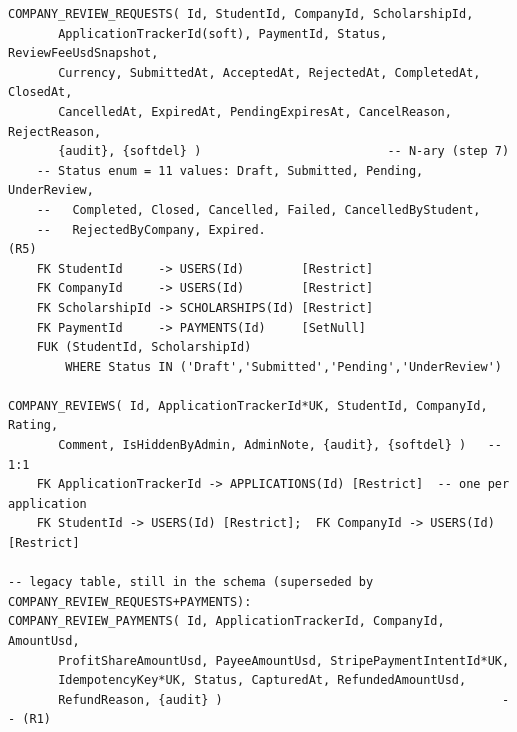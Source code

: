 \documentclass[11pt,a4paper]{article}
\begin{document}
{\begin{verbatim}
COMPANY_REVIEW_REQUESTS( Id, StudentId, CompanyId, ScholarshipId,
       ApplicationTrackerId(soft), PaymentId, Status, ReviewFeeUsdSnapshot,
       Currency, SubmittedAt, AcceptedAt, RejectedAt, CompletedAt, ClosedAt,
       CancelledAt, ExpiredAt, PendingExpiresAt, CancelReason, RejectReason,
       {audit}, {softdel} )                          -- N-ary (step 7)
    -- Status enum = 11 values: Draft, Submitted, Pending, UnderReview,
    --   Completed, Closed, Cancelled, Failed, CancelledByStudent,
    --   RejectedByCompany, Expired.                                   (R5)
    FK StudentId     -> USERS(Id)        [Restrict]
    FK CompanyId     -> USERS(Id)        [Restrict]
    FK ScholarshipId -> SCHOLARSHIPS(Id) [Restrict]
    FK PaymentId     -> PAYMENTS(Id)     [SetNull]
    FUK (StudentId, ScholarshipId)
        WHERE Status IN ('Draft','Submitted','Pending','UnderReview')

COMPANY_REVIEWS( Id, ApplicationTrackerId*UK, StudentId, CompanyId, Rating,
       Comment, IsHiddenByAdmin, AdminNote, {audit}, {softdel} )   -- 1:1
    FK ApplicationTrackerId -> APPLICATIONS(Id) [Restrict]  -- one per application
    FK StudentId -> USERS(Id) [Restrict];  FK CompanyId -> USERS(Id) [Restrict]

-- legacy table, still in the schema (superseded by COMPANY_REVIEW_REQUESTS+PAYMENTS):
COMPANY_REVIEW_PAYMENTS( Id, ApplicationTrackerId, CompanyId, AmountUsd,
       ProfitShareAmountUsd, PayeeAmountUsd, StripePaymentIntentId*UK,
       IdempotencyKey*UK, Status, CapturedAt, RefundedAmountUsd,
       RefundReason, {audit} )                                       -- (R1)
\end{verbatim}}
\end{document}
